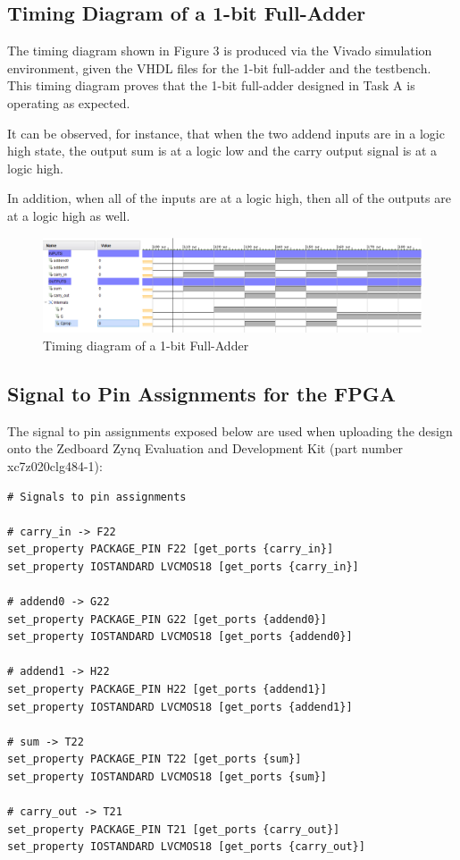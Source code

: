 \documentclass[11pt]{article}
\begin{document}
\subsection{Timing Diagram of a 1-bit Full-Adder}
The timing diagram shown in Figure 3 is produced via the Vivado simulation environment, given the VHDL files for the 1-bit full-adder and the testbench. This timing diagram proves that the 1-bit full-adder designed in Task A is operating as expected. 

It can be observed, for instance, that when the two addend inputs are in a logic high state, the output sum is at a logic low and the carry output signal is at a logic high.

In addition, when all of the inputs are at a logic high, then all of the outputs are at a logic high as well.


\begin{figure}[ht]
    \centering
    \includegraphics[width=1.0 \textwidth]{timing_diagram.png}
    \caption{Timing diagram of a 1-bit Full-Adder}
    \label{fig:isa}
\end{figure}

\newpage

\subsection{Signal to Pin Assignments for the FPGA}

The signal to pin assignments exposed below are used when uploading the design onto the Zedboard Zynq Evaluation and Development Kit (part number xc7z020clg484-1):

\hspace{10mm}
\begin{verbatim}
# Signals to pin assignments

# carry_in -> F22
set_property PACKAGE_PIN F22 [get_ports {carry_in}]
set_property IOSTANDARD LVCMOS18 [get_ports {carry_in}]

# addend0 -> G22
set_property PACKAGE_PIN G22 [get_ports {addend0}]
set_property IOSTANDARD LVCMOS18 [get_ports {addend0}]

# addend1 -> H22
set_property PACKAGE_PIN H22 [get_ports {addend1}]
set_property IOSTANDARD LVCMOS18 [get_ports {addend1}]

# sum -> T22
set_property PACKAGE_PIN T22 [get_ports {sum}]
set_property IOSTANDARD LVCMOS18 [get_ports {sum}]

# carry_out -> T21
set_property PACKAGE_PIN T21 [get_ports {carry_out}]
set_property IOSTANDARD LVCMOS18 [get_ports {carry_out}]
\end{verbatim}
\end{document}
